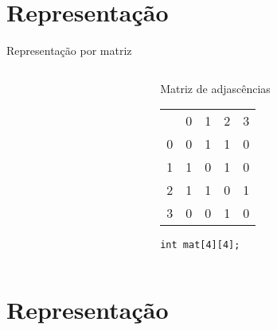 \section{Representação}


\begin{frame}{Representação por matriz}{\inserttitle}

\begin{columns}

\begin{column}{.5\textwidth}

\GG

\end{column}

\begin{column}{.5\textwidth}

\noindent Matriz de adjascências\bigskip

\def\R{\color{red}}
\def\Z{{\color{gray}0}}
\begin{tabular}{ccccc}
		     &\R 0   &\R 1   &\R 2   & \R 3\\
\color{red}	   0 &  \Z   &   1   &   1   &   \Z \\
\color{red} 	   1 &   1   &  \Z   &   1   &   \Z \\
\color{red} 	   2 &   1   &   1   &  \Z   &    1 \\
\color{red} 	   3 &  \Z   &  \Z   &   1   &   \Z \\
\end{tabular}

 {
\vskip 1cm {\tt int mat[4][4];}
}
\end{column}
\end{columns}

\end{frame}


\section{Representação}

